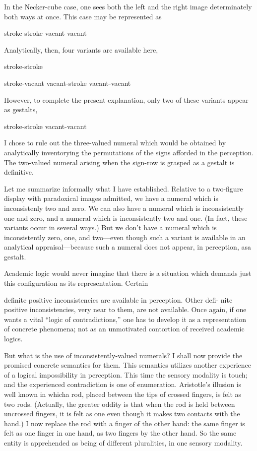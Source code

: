 In the Necker-cube case, one sees both the left and the right image 
determinately both ways at once. This case may be represented as 


stroke stroke 
vacant vacant 


Analytically, then, four variants are available here, 


stroke-stroke 

stroke-vacant 
vacant-stroke 
vacant-vacant 


However, to complete the present explanation, only two of these 
variants appear as gestalts, 


stroke-stroke 
vacant-vacant 


I chose to rule out the three-valued numeral which would be obtained 
by analytically inventorying the permutations of the signs afforded in 
the perception. The two-valued numeral arising when the sign-row is 
grasped as a gestalt is definitive. 

Let me summarize informally what I have established. Relative to 
a two-figure display with paradoxical images admitted, we have a 
numeral which is inconsistenly two and zero. We can also have a 
numeral which is inconsistently one and zero, and a numeral which is 
inconsistently two and one. (In fact, these variants occur in several 
ways.) But we don’t have a numeral which is inconsistently zero, one, 
and two—even though such a variant is available in an analytical 
appraisal—because such a numeral does not appear, in perception, asa 
gestalt. 

Academic logic would never imagine that there is a situation 
which demands just this configuration as its representation. Certain 


definite positive inconsistencies are available in perception. Other defi- 
nite positive inconsistencies, very near to them, are not available. Once 
again, if one wants a vital “logic of contradictions,” one has to develop 
it as a representation of concrete phenomena; not as an unmotivated 
contortion of received academic logics. 


But what is the use of inconsistently-valued numerals? I shall now 
provide the promised concrete semantics for them. This semantics 
utilizes another experience of a logical impossibility in perception. This 
time the sensory modality is touch; and the experienced contradiction 
is one of enumeration. Aristotle’s illusion is well known in whicha rod, 
placed between the tips of crossed fingers, is felt as two rods. (Actually, 
the greater oddity is that when the rod is held between uncrossed 
fingers, it is felt as one even though it makes two contacts with the 
hand.) I now replace the rod with a finger of the other hand: the same 
finger is felt as one finger in one hand, as two fingers by the other hand. 
So the same entity is apprehended as being of different pluralities, in 
one sensory modality. 

